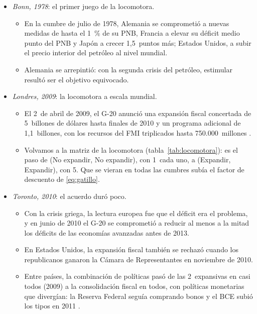 \documentclass[11pt]{article}
\begin{document}
\begin{itemize}
\item \emph{Bonn, 1978}: el primer juego de la locomotora.
  \begin{itemize}
  \item En la cumbre de julio de 1978, Alemania se comprometió a nuevas medidas de hasta el 1~\% de su PNB, Francia a elevar su déficit medio punto del PNB y Japón a crecer 1,5~puntos más; Estados Unidos, a subir el precio interior del petróleo al nivel mundial\nocite{G7Bonn1978Declaration}.
  \item Alemania se arrepintió: con la segunda crisis del petróleo, estimular resultó ser el objetivo equivocado\nocite{Frankel2016Coordination}.
  \end{itemize}
\item \emph{Londres, 2009}: la locomotora a escala mundial.
  \begin{itemize}
  \item El 2~de abril de 2009, el G-20 anunció una expansión fiscal concertada de 5~billones de dólares hasta finales de 2010 y un programa adicional de 1,1~billones, con los recursos del FMI triplicados hasta 750.000~millones\nocite{G20Londres2009} .
  \item Volvamos a la matriz de la locomotora (tabla~\ref{tab:locomotora}): es el paso de (No expandir, No expandir), con 1~cada uno, a (Expandir, Expandir), con 5. Que se vieran en todas las cumbres subía el factor de descuento de \eqref{eq:gatillo}.
  \end{itemize}
\item \emph{Toronto, 2010}: el acuerdo duró poco.
  \begin{itemize}
  \item Con la crisis griega, la lectura europea fue que el déficit era el problema, y en junio de 2010 el G-20 se comprometió a reducir al menos a la mitad los déficits de las economías avanzadas antes de 2013\nocite{G202010Toronto}.
  \item En Estados Unidos, la expansión fiscal también se rechazó cuando los republicanos ganaron la Cámara de Representantes en noviembre de 2010\nocite{CamaraEEUU2026Divisiones}.
  \item Entre países, la combinación de políticas pasó de las 2~expansivas en casi todos (2009) a la consolidación fiscal en todos, con políticas monetarias que divergían: la Reserva Federal seguía comprando bonos y el BCE subió los tipos en 2011 .
  \end{itemize}

\end{itemize}
\end{document}
